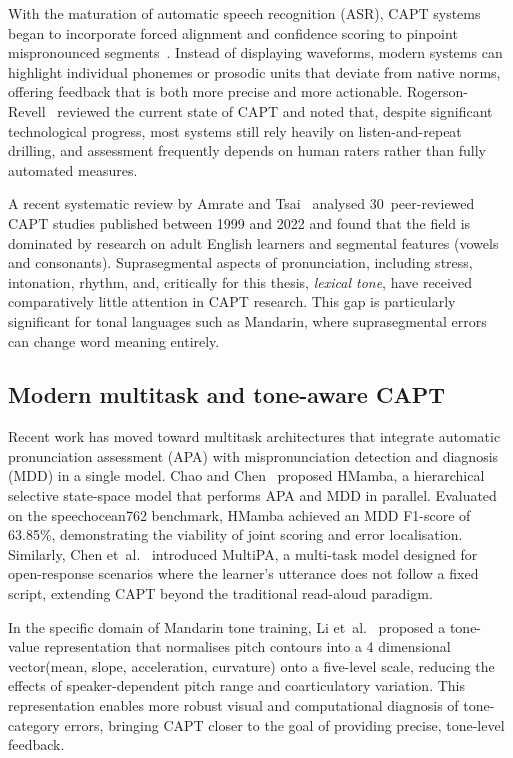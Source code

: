 With the maturation of automatic speech recognition (ASR), CAPT systems began to incorporate forced alignment and confidence scoring to pinpoint mispronounced segments~\cite{rogerson2021}. Instead of displaying waveforms, modern systems can highlight individual phonemes or prosodic units that deviate from native norms, offering feedback that is both more precise and more actionable. Rogerson-Revell~\cite{rogerson2021} reviewed the current state of CAPT and noted that, despite significant technological progress, most systems still rely heavily on listen-and-repeat drilling, and assessment frequently depends on human raters rather than fully automated measures.

A recent systematic review by Amrate and Tsai~\cite{zolnay2024} analysed 30~peer-reviewed CAPT studies published between 1999 and 2022 and found that the field is dominated by research on adult English learners and segmental features (vowels and consonants). Suprasegmental aspects of pronunciation, including stress, intonation, rhythm, and, critically for this thesis, \emph{lexical tone}, have received comparatively little attention in CAPT research. This gap is particularly significant for tonal languages such as Mandarin, where suprasegmental errors can change word meaning entirely.

\subsection{Modern multitask and tone-aware CAPT}

Recent work has moved toward multitask architectures that integrate automatic pronunciation assessment (APA) with mispronunciation detection and diagnosis (MDD) in a single model. Chao and Chen~\cite{chao-chen-2025-towards} proposed HMamba, a hierarchical selective state-space model that performs APA and MDD in parallel. Evaluated on the speechocean762 benchmark, HMamba achieved an MDD F1-score of 63.85\%, demonstrating the viability of joint scoring and error localisation. Similarly, Chen et~al.~\cite{chen2024multipa} introduced MultiPA, a multi-task model designed for open-response scenarios where the learner's utterance does not follow a fixed script, extending CAPT beyond the traditional read-aloud paradigm.

In the specific domain of Mandarin tone training, Li et~al.~\cite{li2024tone} proposed a tone-value representation that normalises pitch contours into a 4 dimensional vector(mean, slope, acceleration, curvature) onto a five-level scale, reducing the effects of speaker-dependent pitch range and coarticulatory variation. This representation enables more robust visual and computational diagnosis of tone-category errors, bringing CAPT closer to the goal of providing precise, tone-level feedback.

